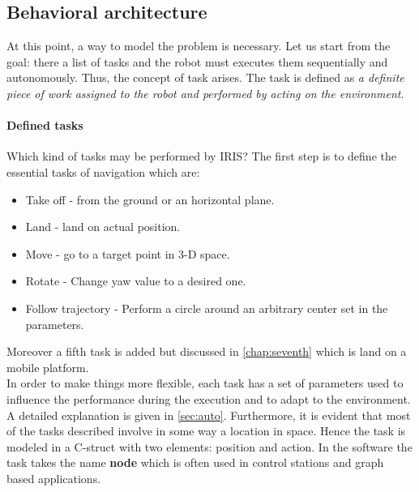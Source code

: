 \subsection{Behavioral architecture}
\label{sec:behav}
At this point, a way to model the problem is necessary. Let us start from the goal: there a list of tasks and the robot must executes them sequentially and autonomously. Thus, the concept of task arises. The task is defined as \textit{a definite piece of work assigned to the robot and performed by acting on the environment}. 

\paragraph{Defined tasks} Which kind of tasks may be performed by IRIS? The first step is to define the essential tasks of navigation which are:
\begin{itemize}
\item Take off - from the ground or an horizontal plane.
\item Land - land on actual position.
\item Move - go to a target point in 3-D space.
\item Rotate - Change yaw value to a desired one.
\item Follow trajectory - Perform a circle around an arbitrary center set in the parameters.
\end{itemize}
Moreover a fifth task is added but discussed in \ref{chap:seventh} which is land on a mobile platform. \newline \\
In order to make things more flexible, each task has a set of parameters used to influence the performance during the execution and to adapt to the environment. A detailed explanation is given in \ref{sec:auto}. Furthermore, it is evident that most of the tasks described involve in some way a location in space. Hence the task is modeled in a C-struct with two elements: position and action. In the software the task takes the name \textbf{node} which is often used in control stations and graph based applications.

